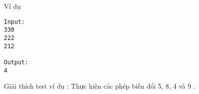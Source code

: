 Ví dụ
\begin{verbatim}
Input:
330
222
212

Output:
4
\end{verbatim}

Giải thích test ví dụ : Thực hiện các phép biến đổi 5, 8, 4 và 9 .